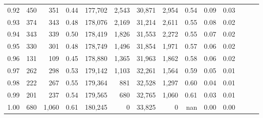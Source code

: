 \begin{tabular}{rrrrrrrrrrrrrr}
0.92 &    450 &    351 &  0.44 &  177,702 &    2,543 &  30,871 &   2,954 &  0.54 &  0.09 &      0.03 \\
0.93 &    374 &    343 &  0.48 &  178,076 &    2,169 &  31,214 &   2,611 &  0.55 &  0.08 &      0.02 \\
0.94 &    343 &    339 &  0.50 &  178,419 &    1,826 &  31,553 &   2,272 &  0.55 &  0.07 &      0.02 \\
0.95 &    330 &    301 &  0.48 &  178,749 &    1,496 &  31,854 &   1,971 &  0.57 &  0.06 &      0.02 \\
0.96 &    131 &    109 &  0.45 &  178,880 &    1,365 &  31,963 &   1,862 &  0.58 &  0.06 &      0.02 \\
0.97 &    262 &    298 &  0.53 &  179,142 &    1,103 &  32,261 &   1,564 &  0.59 &  0.05 &      0.01 \\
0.98 &    222 &    267 &  0.55 &  179,364 &      881 &  32,528 &   1,297 &  0.60 &  0.04 &      0.01 \\
0.99 &    201 &    237 &  0.54 &  179,565 &      680 &  32,765 &   1,060 &  0.61 &  0.03 &      0.01 \\
1.00 &    680 &  1,060 &  0.61 &  180,245 &        0 &  33,825 &       0 &   nan &  0.00 &      0.00 \\
\bottomrule
\end{tabular}
